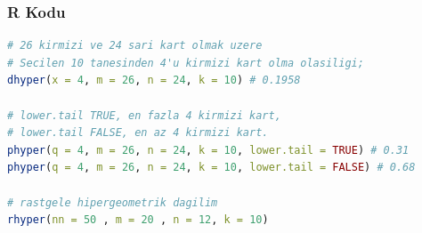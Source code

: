 \subsubsection{R Kodu}

\begin{lstlisting}[language=R]
# 26 kirmizi ve 24 sari kart olmak uzere
# Secilen 10 tanesinden 4'u kirmizi kart olma olasiligi;
dhyper(x = 4, m = 26, n = 24, k = 10) # 0.1958

# lower.tail TRUE, en fazla 4 kirmizi kart,
# lower.tail FALSE, en az 4 kirmizi kart.
phyper(q = 4, m = 26, n = 24, k = 10, lower.tail = TRUE) # 0.31
phyper(q = 4, m = 26, n = 24, k = 10, lower.tail = FALSE) # 0.68

# rastgele hipergeometrik dagilim
rhyper(nn = 50 , m = 20 , n = 12, k = 10)
\end{lstlisting}

\newpage 